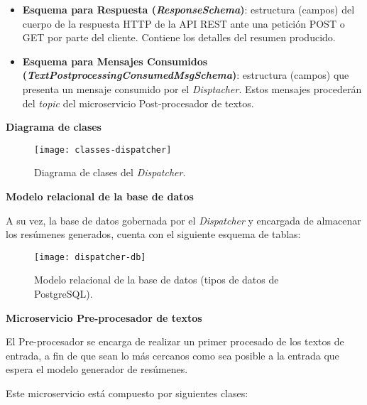 \begin{itemize} [\textbullet]
	\item \textbf{Esquema para Respuesta (\emph{ResponseSchema})}: estructura (campos) del cuerpo de la respuesta HTTP de la API REST ante una petición POST o GET por parte del cliente. Contiene los detalles del resumen producido.
	
	\item \textbf{Esquema para Mensajes Consumidos \\ (\emph{TextPostprocessingConsumedMsgSchema})}: estructura (campos) que presenta un mensaje consumido por el \emph{Disptacher}. Estos mensajes procederán del \emph{topic} del microservicio Post-procesador de textos.
\end{itemize}

\noindent
\textbf{Diagrama de clases}

\begin{figure}[h]
	\centering
	\texttt{[image: classes-dispatcher]}
	\vspace{-0.5cm}
	\caption{Diagrama de clases del \emph{Dispatcher}.}
\end{figure}

\newpage

\noindent
\textbf{Modelo relacional de la base de datos}

A su vez, la base de datos gobernada por el \emph{Dispatcher} y encargada de almacenar los resúmenes generados, cuenta con el siguiente esquema de tablas:

\smallskip

\begin{figure}[h!]
	\centering
	\texttt{[image: dispatcher-db]}
	\vspace{-0.5cm}
	\caption[Modelo relacional de la base de datos.]{Modelo relacional de la base de datos (tipos de datos de PostgreSQL).}
\end{figure}

\newpage

\noindent
\textbf{\large Microservicio Pre-procesador de textos}

El Pre-procesador se encarga de realizar un primer procesado de los textos de entrada, a fin de que sean lo más cercanos como sea posible a la entrada que espera el modelo generador de resúmenes.

Este microservicio está compuesto por siguientes clases:

